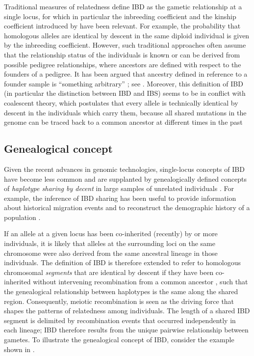 Traditional measures of relatedness define IBD as the gametic relationship at a single locus, for which in particular the inbreeding coefficient and the kinship coefficient introduced by \citet{Wright:1921tk,Wright:1922cr} have been relevant.
For example, the probability that  homologous alleles are identical by descent in the same diploid individual is given by the inbreeding coefficient.
However, such traditional approaches often assume that the relationship status of the individuals is known or can be derived from possible pedigree relationships, where ancestors are defined with respect to the founders of a pedigree.
It has been argued that ancestry defined in reference to a founder sample is ``something arbitrary'' \citep[][p~141]{maynardsmith1989}; see \citet{Rousset:2002bz}.
Moreover, this definition of IBD (in particular the distinction between IBD and IBS) seems to be in conflict with coalescent theory, which postulates that every allele is technically identical by descent in the individuals which carry them, because all shared mutations in the genome can be traced back to a common ancestor at different times in the past \citep{Powell:2010di}

%
\subsection{Genealogical concept}
\label{sec:genealogical_ibd}
%

Given the recent advances in genomic technologies, single-locus concepts of IBD have become less common and are supplanted by genealogically defined concepts of \emph{haplotype sharing by decent} in large samples of unrelated individuals \citep{Thompson:2013cj,Wakeley2016book}.
For example, the inference of IBD sharing has been useful to provide information about historical migration events and to reconstruct the demographic history of a population \citep{Palamara:2012cya,Palamara:2013eg,Harris:2013id}.

%

%

If an allele at a given locus has been co-inherited (recently) by  or more individuals, it is likely that alleles at the surrounding loci on the same chromosome were also derived from the same ancestral lineage in those individuals.
The definition of IBD is therefore extended to refer to homologous chromosomal \emph{segments} that are identical by descent if they have been co-inherited without intervening recombination from a common ancestor \citep{Hayes:2003gj,Powell:2010di}, such that the genealogical relationship between  haplotypes is the same along the shared region.
Consequently, meiotic recombination is seen as the driving force that shapes the patterns of relatedness among individuals.
The length of a shared IBD segment is delimited by recombination events that occurred independently in each lineage; IBD therefore results from the unique pairwise relationship between  gametes.
To illustrate the genealogical concept of IBD, consider the example shown in .

